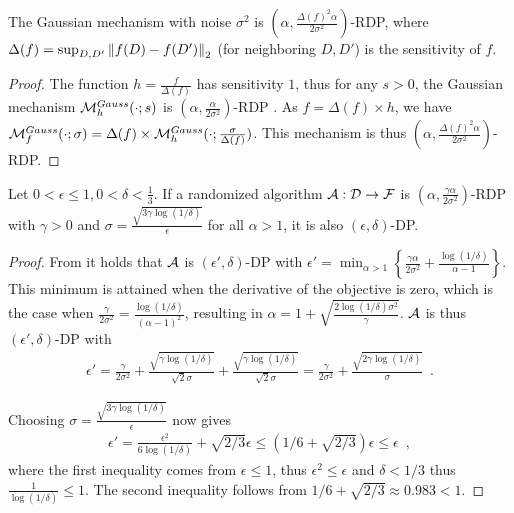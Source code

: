 \begin{lemma}
  \label{lemma:gaussian-rdp-private}
  The Gaussian mechanism with noise $\sigma^2$ is
  $(\alpha, \frac{\Delta(f)^2 \alpha}{2 \sigma^2})$-RDP, where
  $\Delta(f) = \sup_{D,D'} \left \lVert f(D) - f(D') \right \rVert_2$ (for neighboring
  $D, D'$) is the sensitivity of $f$.
\end{lemma}
\begin{proof}
  The function $h = \frac{f}{\Delta(f)}$ has sensitivity $1$, thus for
  any $s > 0$, the Gaussian mechanism $\mathcal M_h^{Gauss}(\cdot;s)$ is
  $(\alpha, \frac{\alpha}{2\sigma^2})$-RDP
  \citep[Corollary~1]{mironov2017Renyi}. As $f = \Delta(f) \times h$,
  we have
  $\mathcal M_f^{Gauss}(\cdot;\sigma) = \Delta(f) \times
  \mathcal M_h^{Gauss}(\cdot;\frac{\sigma}{\Delta(f)})$.
  This mechanism is thus
  $(\alpha, \frac{\Delta(f)^2\alpha}{2\sigma^2})$-RDP.
\end{proof}


\begin{corollary}
  \label{cor:rdp-to-dp}
  Let $0 < \epsilon \le 1, 0 < \delta < \tfrac{1}{3}$. If a randomized
  algorithm $\mathcal A : \mathcal D \rightarrow \mathcal F$ is
  $(\alpha, \frac{\gamma \alpha}{2 \sigma^2})$-RDP with $\gamma > 0$ and
  $\sigma = \frac{\sqrt{3 \gamma \log(1/\delta)}}{\epsilon}$ for all
  $\alpha > 1$, it is also $(\epsilon, \delta)$-DP.
\end{corollary}

\begin{proof}
  From  it holds that $\mathcal A$ is
  $(\epsilon',\delta)$-DP with
  $\epsilon' = \min_{\alpha > 1} \left\{ \frac{\gamma \alpha}{2 \sigma^2} +
    \frac{\log(1/\delta)}{\alpha - 1} \right\}.$ This minimum is
  attained when the derivative of the objective is zero, which is the
  case when
  $\frac{\gamma}{2\sigma^2} = \frac{\log(1/\delta)}{(\alpha - 1)^2}$,
  resulting in $\alpha = 1 + \sqrt{\frac{2\log(1/\delta)\sigma^2}{\gamma}}$.
  $\mathcal A$ is thus $(\epsilon', \delta)$-DP with
  \begin{align}
  \label{eq:full_privacy_formula}
    \epsilon' = \frac{\gamma}{2\sigma^2} + \frac{\sqrt{\gamma \log(1/\delta)}}{\sqrt{2} \sigma}
    + \frac{\sqrt{\gamma \log(1/\delta)}}{\sqrt{2} \sigma}
     = \frac{\gamma}{2\sigma^2} + \frac{\sqrt{2\gamma \log(1/\delta)}}{\sigma}\enspace.
  \end{align}

  Choosing $\sigma = \frac{\sqrt{3 \gamma \log(1/\delta)}}{\epsilon}$
  now gives
  \begin{align}
    \epsilon'
    = \frac{\epsilon^2}{6 \log(1/\delta)} + \sqrt{{2}/{3}} \epsilon
    \le (1/6  + \sqrt{2/3}) \epsilon
    \le \epsilon\enspace,
  \end{align}
  where the first inequality comes from $\epsilon \leq 1$, thus $\epsilon^2
  \le \epsilon$
  and $\delta < 1/3$ thus $\frac{1}{\log(1/\delta)} \le 1$.
  The second inequality follows from $1/6  + \sqrt{2/3} \approx 0.983 < 1$.
\end{proof}


